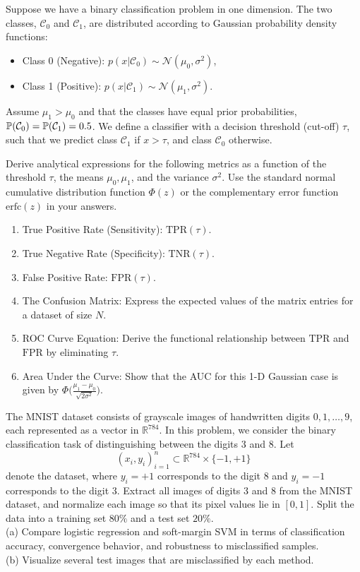\begin{myexercise}
Suppose we have a binary classification problem in one dimension. The two classes, $\mathcal{C}_0$ and $\mathcal{C}_1$, are distributed according to Gaussian probability density functions: 
\begin{itemize}
\item[(i)] 
Class 0 (Negative): $p(x | \mathcal{C}_0) \sim \mathcal{N}(\mu_0, \sigma^2)$,
\item[(ii)] Class 1 (Positive): $p(x | \mathcal{C}_1) \sim \mathcal{N}(\mu_1, \sigma^2)$.
\end{itemize}
Assume $\mu_1 > \mu_0$ and that the classes have equal prior probabilities, $\P(\mathcal{C}_0) = \P(\mathcal{C}_1) = 0.5$. We define a classifier with a decision threshold (cut-off) $\tau$, such that we predict class $\mathcal{C}_1$ if $x > \tau$, and class $\mathcal{C}_0$ otherwise.

Derive analytical expressions for the following metrics as a function of the threshold $\tau$, the means $\mu_0, \mu_1$, and the variance $\sigma^2$. Use the standard normal cumulative distribution function $\Phi(z)$ or the complementary error function $\text{erfc}(z)$ in your answers.
\begin{enumerate}
\item  True Positive Rate (Sensitivity): $\text{TPR}(\tau)$.
\item
True Negative Rate (Specificity): $\text{TNR}(\tau)$.
\item
False Positive Rate: $\text{FPR}(\tau)$.
\item
The Confusion Matrix: Express the expected values of the matrix entries for a dataset of size $N$.
\item
ROC Curve Equation: Derive the functional relationship between $\text{TPR}$ and $\text{FPR}$ by eliminating $\tau$.
\item
Area Under the Curve: Show that the AUC for this 1-D Gaussian case is given by $\Phi\big(\frac{\mu_1 - \mu_0}{\sqrt{2\sigma^2}}\big)$.
\end{enumerate}
\end{myexercise}



\begin{myexercise}
The MNIST dataset consists of grayscale images of handwritten digits $0,1,\dots,9$, each represented as a vector in $\mathbb{R}^{784}$. 
In this problem, we consider the binary classification task of distinguishing between the digits 3 and 8.
Let
$$
{(x_i,y_i)}_{i=1}^n \subset \mathbb{R}^{784} \times \{-1,+1\}
$$
denote the dataset, where $y_i = +1$ corresponds to the digit 8 and $y_i = -1$ corresponds to the digit 3.
Extract all images of digits 3 and 8 from the MNIST dataset, and normalize each image so that its pixel values lie in $[0,1]$. Split the data into a training set $80\%$ and a test set $20\%$. \\
(a) Compare logistic regression and soft-margin SVM in terms of classification accuracy, convergence behavior, and robustness to misclassified samples. \\
(b) Visualize several test images that are misclassified by each method.
\end{myexercise}

